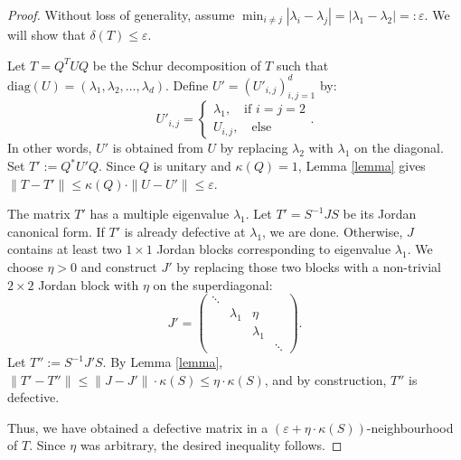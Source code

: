 \begin{proof}
    Without loss of generality, assume $\min_{i\neq j} |\lambda_i - \lambda_j| = |\lambda_1 - \lambda_2| =: \varepsilon$. We will show that $\delta(T) \leqslant \varepsilon$. 
    
    Let $T = Q^T U Q$ be the Schur decomposition of $T$ such that $\mathrm{diag}(U) = (\lambda_1, \lambda_2, \dots, \lambda_d)$. Define $U' = \left(U'_{i,j}\right)_{i,j=1}^d$ by: 
    \begin{equation*} 
        U'_{i,j} = \begin{cases}
            \lambda_1, \quad \text{if } i=j=2 \\
            U_{i,j}, \quad \text{else}
        \end{cases}.
    \end{equation*}
   In other words, $U'$ is obtained from $U$ by replacing $\lambda_2$ with $\lambda_1$ on the diagonal. Set $T' := Q^* U' Q$. Since $Q$ is unitary and $\kappa(Q) = 1$, Lemma \ref{lemma} gives $\| T - T' \| \leqslant \kappa(Q) \cdot \|U - U'\| \leqslant \varepsilon $.
    
     The matrix $T'$ has a multiple eigenvalue $\lambda_1$. Let $T' = S^{-1} J S$ be its Jordan canonical form. If $T'$ is already defective at $\lambda_1$, we are done. Otherwise, $J$ contains at least two $1 \times 1$ Jordan blocks corresponding to eigenvalue $\lambda_1$. We choose $\eta > 0$ and construct $J'$ by replacing those two blocks with a non-trivial $2\times2$ Jordan block with $\eta$ on the superdiagonal:
     \begin{equation*}
         J' = \begin{pmatrix}
         \ddots & & & \\
         & \lambda_1 & \eta & \\
         & & \lambda_1 & \\
         & & & \ddots
         \end{pmatrix}.
     \end{equation*}
     Let $T'':=S^{-1}J'S$. By Lemma \ref{lemma}, $\|T' - T''\| \leqslant \|J - J'\|\cdot\kappa(S) \leqslant \eta \cdot\kappa(S)$, and by construction, $T''$ is defective.

     Thus, we have obtained a defective matrix in a $(\varepsilon + \eta \cdot \kappa(S))$-neighbourhood of $T$. Since $\eta$ was arbitrary, the desired inequality follows.
    
\end{proof}